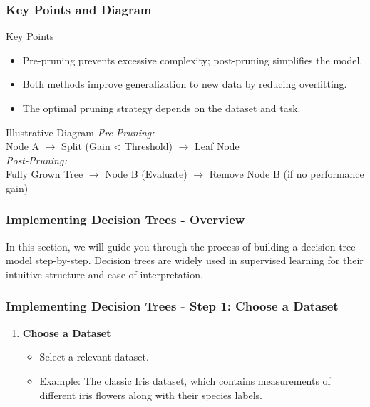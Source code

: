 \documentclass[aspectratio=169]{beamer}
\begin{document}
\begin{frame}[fragile]
    \frametitle{Key Points and Diagram}
    \begin{block}{Key Points}
        \begin{itemize}
            \item Pre-pruning prevents excessive complexity; post-pruning simplifies the model.
            \item Both methods improve generalization to new data by reducing overfitting.
            \item The optimal pruning strategy depends on the dataset and task. 
        \end{itemize}
    \end{block}

    \begin{block}{Illustrative Diagram}
        \textit{Pre-Pruning:} \\
        Node A $\rightarrow$ Split (Gain < Threshold) $\rightarrow$ Leaf Node \\

        \textit{Post-Pruning:} \\
        Fully Grown Tree $\rightarrow$ Node B (Evaluate) $\rightarrow$ Remove Node B (if no performance gain)
    \end{block}
\end{frame}

\begin{frame}
    \frametitle{Implementing Decision Trees - Overview}
    In this section, we will guide you through the process of building a decision tree model step-by-step. 
    Decision trees are widely used in supervised learning for their intuitive structure and ease of interpretation.
\end{frame}

\begin{frame}[fragile]
    \frametitle{Implementing Decision Trees - Step 1: Choose a Dataset}
    \begin{enumerate}
        \item \textbf{Choose a Dataset}
        \begin{itemize}
            \item Select a relevant dataset. 
            \item Example: The classic Iris dataset, which contains measurements of different iris flowers along with their species labels.
        \end{itemize}
    \end{enumerate}
\end{frame}
\end{document}
